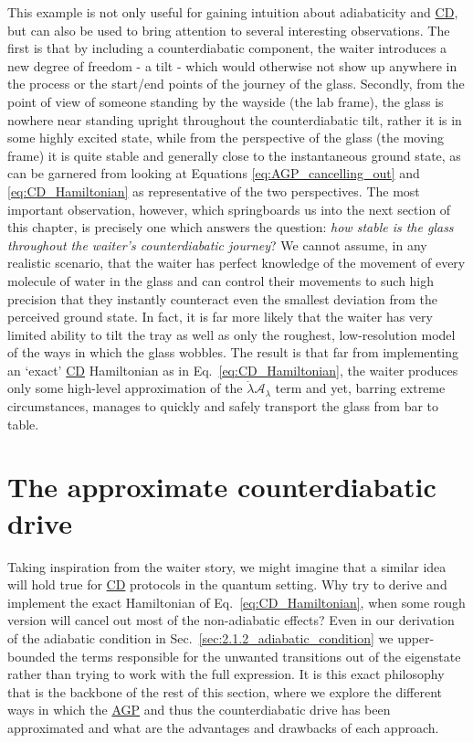 \documentclass[a4paper,oneside,11pt]{book}
\newcommand{\AGP}[1]{\mathcal{A}_{#1}}
\newcommand{\dotlambda}{\dot{\lambda}}
\newcommand{\acrref}[1]{\hyperref[acr:#1]{#1}}
\begin{document}
    This example is not only useful for gaining intuition about adiabaticity and \acrref{CD}, but can also be used to bring attention to several interesting observations. The first is that by including a counterdiabatic component, the waiter introduces a new degree of freedom - a tilt - which would otherwise not show up anywhere in the process or the start/end points of the journey of the glass. Secondly, from the point of view of someone standing by the wayside (the lab frame), the glass is nowhere near standing upright throughout the counterdiabatic tilt, rather it is in some highly excited state, while from the perspective of the glass (the moving frame) it is quite stable and generally close to the instantaneous ground state, as can be garnered from looking at Equations \eqref{eq:AGP_cancelling_out} and \eqref{eq:CD_Hamiltonian} as representative of the two perspectives. The most important observation, however, which springboards us into the next section of this chapter, is precisely one which answers the question: \emph{how stable is the glass throughout the waiter's counterdiabatic journey}? We cannot assume, in any realistic scenario, that the waiter has perfect knowledge of the movement of every molecule of water in the glass and can control their movements to such high precision that they instantly counteract even the smallest deviation from the perceived ground state. In fact, it is far more likely that the waiter has very limited ability to tilt the tray as well as only the roughest, low-resolution model of the ways in which the glass wobbles. The result is that far from implementing an `exact' \acrref{CD} Hamiltonian as in Eq.~\eqref{eq:CD_Hamiltonian}, the waiter produces only some high-level approximation of the $\dotlambda \AGP{\lambda}$ term and yet, barring extreme circumstances, manages to quickly and safely transport the glass from bar to table.

    \section{The approximate counterdiabatic drive}\label{sec:2.4_approximate_CD}

    Taking inspiration from the waiter story, we might imagine that a similar idea will hold true for \acrref{CD} protocols in the quantum setting. Why try to derive and implement the exact Hamiltonian of Eq.~\eqref{eq:CD_Hamiltonian}, when some rough version will cancel out most of the non-adiabatic effects? Even in our derivation of the adiabatic condition in Sec.~\ref{sec:2.1.2_adiabatic_condition} we upper-bounded the terms responsible for the unwanted transitions out of the eigenstate rather than trying to work with the full expression. It is this exact philosophy that is the backbone of the rest of this section, where we explore the different ways in which the \acrref{AGP} and thus the counterdiabatic drive has been approximated and what are the advantages and drawbacks of each approach. 
\end{document}

